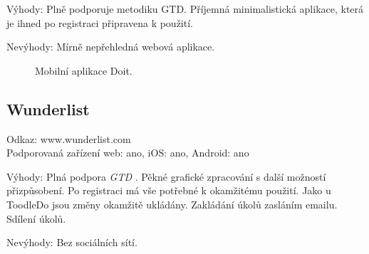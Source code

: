 \documentclass[thesis=B,czech]{FITthesis}[2012/06/26]
\newcommand{\GTD}{\textit{GTD }}
\begin{document}
Výhody:
Plně podporuje metodiku GTD. Příjemná minimalistická aplikace, která je ihned po registraci připravena k použití.  

Nevýhody:
Mírně nepřehledná webová aplikace.

\begin{figure}[h]
	\caption{Mobilní aplikace Doit.\cite{doit_overviewgram}}\label{fig:doit_overviewgram}
\end{figure}

\newpage

\subsection{Wunderlist}

Odkaz: www.wunderlist.com\cite{gtd_existing_compare_wunderlist}\\
Podporovaná zařízení web: ano, iOS: ano, Android: ano

Výhody:
Plná podpora \GTD. Pěkné grafické zpracování s další možností přizpůsobení. Po registraci má vše potřebné k okamžitému použití. Jako u ToodleDo jsou změny okamžitě ukládány. Zakládání úkolů zasláním emailu. Sdílení úkolů.

Nevýhody:
Bez sociálních sítí. 
\end{document}
